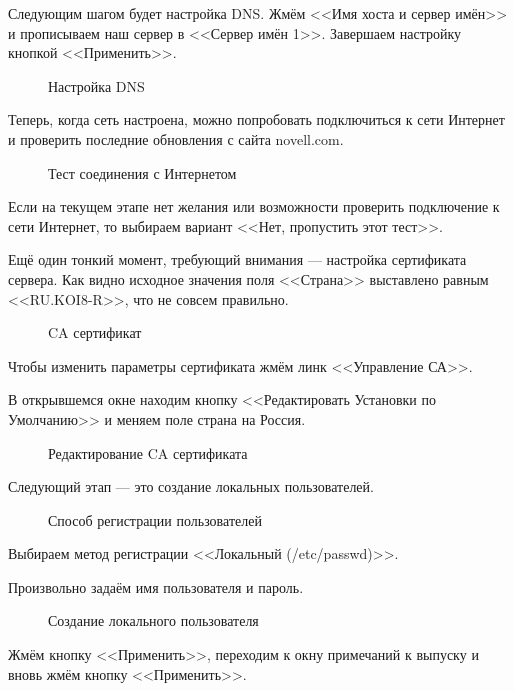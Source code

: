 Следующим шагом будет настройка DNS. Жмём <<Имя хоста и сервер имён>> и прописываем наш сервер в <<Сервер имён 1>>. Завершаем настройку кнопкой <<Применить>>.
\begin{figure}[H]
\caption{Настройка DNS}
\label{fig9}
\end{figure}
\clearpage

Теперь, когда сеть настроена, можно попробовать подключиться к сети Интернет и проверить последние обновления с сайта novell.com.
\begin{figure}[H]
\caption{Тест соединения с Интернетом}
\label{fig10}
\end{figure}
Если на текущем этапе нет желания или возможности проверить подключение к сети Интернет, то выбираем вариант <<Нет, пропустить этот тест>>.
\clearpage

Ещё один тонкий момент, требующий внимания — настройка сертификата сервера. Как видно исходное значения поля <<Страна>> выставлено равным <<RU.KOI8-R>>, что не совсем правильно. 
\begin{figure}[H]
\caption{CA сертификат}
\label{sertificate}
\end{figure}
Чтобы изменить параметры сертификата жмём линк <<Управление СА>>. 
\clearpage

В открывшемся окне находим кнопку <<Редактировать Установки по Умолчанию>> и меняем поле страна на Россия.
\begin{figure}[H]
\caption{Редактирование CA сертификата}
\label{fig11}
\end{figure}
\clearpage

Следующий этап --- это создание локальных пользователей.
\begin{figure}[H]
\caption{Способ регистрации пользователей}
\label{fig12}
\end{figure}
Выбираем метод регистрации <<Локальный (/etc/passwd)>>.
\clearpage

Произвольно задаём имя пользователя и пароль.
\begin{figure}[H]
\caption{Создание локального пользователя}
\label{fig13}
\end{figure}
Жмём кнопку <<Применить>>, переходим к окну примечаний к выпуску и вновь жмём кнопку <<Применить>>.
\clearpage

